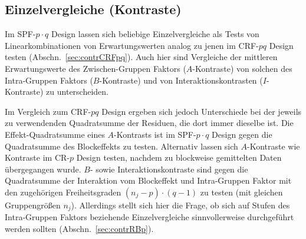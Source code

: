 \subsection{Einzelvergleiche (Kontraste)}

Im SPF-$p \cdot q$ Design lassen sich beliebige Einzelvergleiche als Tests von Linearkombinationen von Erwartungswerten analog zu jenen im CRF-$pq$ Design testen (Abschn.\ \ref{sec:contrCRFpq}). Auch hier sind Vergleiche der mittleren Erwartungswerte des Zwischen-Gruppen Faktors ($A$-Kontraste) von solchen des Intra-Gruppen Faktors ($B$-Kontraste) und von Interaktionskontrasten ($I$-Kontraste) zu unterscheiden.

Im Vergleich zum CRF-$pq$ Design ergeben sich jedoch Unterschiede bei der jeweils zu verwendenden Quadratsumme der Residuen, die dort immer dieselbe ist. Die Effekt-Quadratsumme eines $A$-Kontrasts ist im SPF-$p \cdot q$ Design gegen die Quadratsumme des Blockeffekts zu testen. Alternativ lassen sich $A$-Kontraste wie Kontraste im CR-$p$ Design testen, nachdem zu blockweise gemittelten Daten übergegangen wurde. $B$- sowie Interaktionskontraste sind gegen die Quadratsumme der Interaktion vom Blockeffekt und Intra-Gruppen Faktor mit den zugehörigen Freiheitsgraden $(n_{j}-p) \cdot (q-1)$ zu testen (mit gleichen Gruppengrößen $n_{j}$). Allerdings stellt sich hier die Frage, ob sich auf Stufen des Intra-Gruppen Faktors beziehende Einzelvergleiche sinnvollerweise durchgeführt werden sollten (Abschn.\ \ref{sec:contrRBp}).

